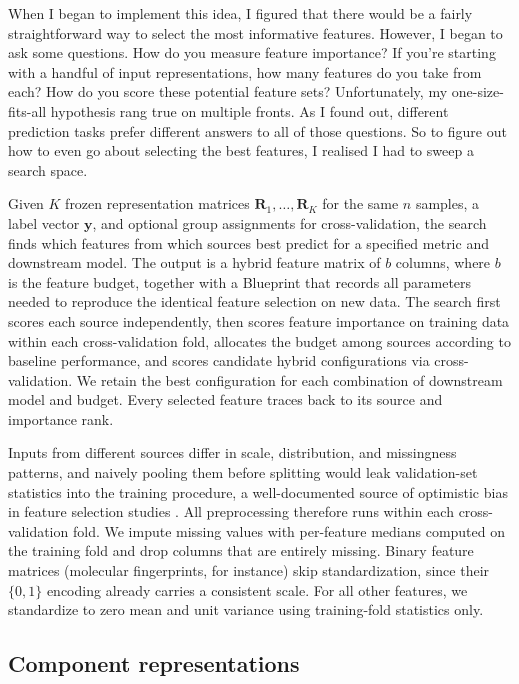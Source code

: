 When I began to implement this idea, I figured that there would be a fairly straightforward way to select the most informative features. However, I began to ask some questions. How do you measure feature importance? If you're starting with a handful of input representations, how many features do you take from each? How do you score these potential feature sets?  Unfortunately, my one-size-fits-all hypothesis rang true on multiple fronts. As I found out, different prediction tasks prefer different answers to all of those questions. So to figure out how to even go about selecting the best features, I realised I had to sweep a search space. 

Given $K$ frozen representation matrices $\mathbf{R}_1, \dots, \mathbf{R}_K$ for the same $n$ samples, a label vector $\mathbf{y}$, and optional group assignments for cross-validation, the search finds which features from which sources best predict for a specified metric and downstream model. The output is a hybrid feature matrix of $b$ columns, where $b$ is the feature budget, together with a Blueprint that records all parameters needed to reproduce the identical feature selection on new data. The search first scores each source independently, then scores feature importance on training data within each cross-validation fold, allocates the budget among sources according to baseline performance, and scores candidate hybrid configurations via cross-validation. We retain the best configuration for each combination of downstream model and budget. Every selected feature traces back to its source and importance rank. 

Inputs from different sources differ in scale, distribution, and missingness patterns, and naively pooling them before splitting would leak validation-set statistics into the training procedure, a well-documented source of optimistic bias in feature selection studies \citep{Ambroise2002, Vabalas2019}. All preprocessing therefore runs within each cross-validation fold. We impute missing values with per-feature medians computed on the training fold and drop columns that are entirely missing. Binary feature matrices (molecular fingerprints, for instance) skip standardization, since their $\{0,1\}$ encoding already carries a consistent scale. For all other features, we standardize to zero mean and unit variance using training-fold statistics only.

\subsection{Component representations}

